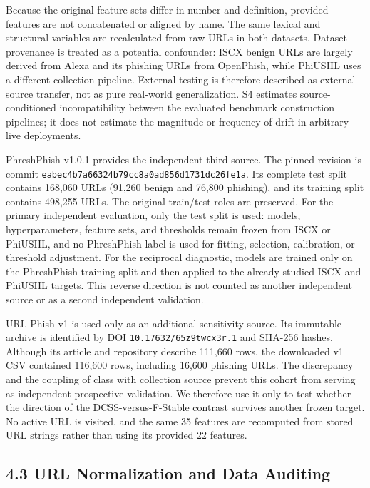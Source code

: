 \documentclass[
  10pt,
]{article}
\begin{document}
Because the original feature sets differ in number and definition,
provided features are not concatenated or aligned by name. The same
lexical and structural variables are recalculated from raw URLs in both
datasets. Dataset provenance is treated as a potential confounder: ISCX
benign URLs are largely derived from Alexa and its phishing URLs from
OpenPhish, while PhiUSIIL uses a different collection
pipeline\citep{Mamun2016, Prasad2024}. External testing is therefore
described as external-source transfer, not as pure real-world
generalization. S4 estimates source-conditioned incompatibility between
the evaluated benchmark construction pipelines; it does not estimate the
magnitude or frequency of drift in arbitrary live deployments.

PhreshPhish v1.0.1 provides the independent third
source\citep{Dalton2025}. The pinned revision is commit
\nolinkurl{eabec4b7a66324b79cc8a0ad856d1731dc26fe1a}. Its complete test
split contains 168,060 URLs (91,260 benign and 76,800 phishing), and its
training split contains 498,255 URLs. The original train/test roles are
preserved. For the primary independent evaluation, only the test split
is used: models, hyperparameters, feature sets, and thresholds remain
frozen from ISCX or PhiUSIIL, and no PhreshPhish label is used for
fitting, selection, calibration, or threshold adjustment. For the
reciprocal diagnostic, models are trained only on the PhreshPhish
training split and then applied to the already studied ISCX and PhiUSIIL
targets. This reverse direction is not counted as another independent
source or as a second independent validation.

URL-Phish v1 is used only as an additional sensitivity
source\citep{Linh2025}. Its immutable archive is identified by DOI
\texttt{10.17632/65z9twcx3r.1} and SHA-256 hashes. Although its article
and repository describe 111,660 rows, the downloaded v1 CSV contained
116,600 rows, including 16,600 phishing URLs. The discrepancy and the
coupling of class with collection source prevent this cohort from
serving as independent prospective validation. We therefore use it only
to test whether the direction of the DCSS-versus-F-Stable contrast
survives another frozen target. No active URL is visited, and the same
35 features are recomputed from stored URL strings rather than using its
provided 22 features.

\subsection{4.3 URL Normalization and Data
Auditing}\label{url-normalization-and-data-auditing}
\end{document}
